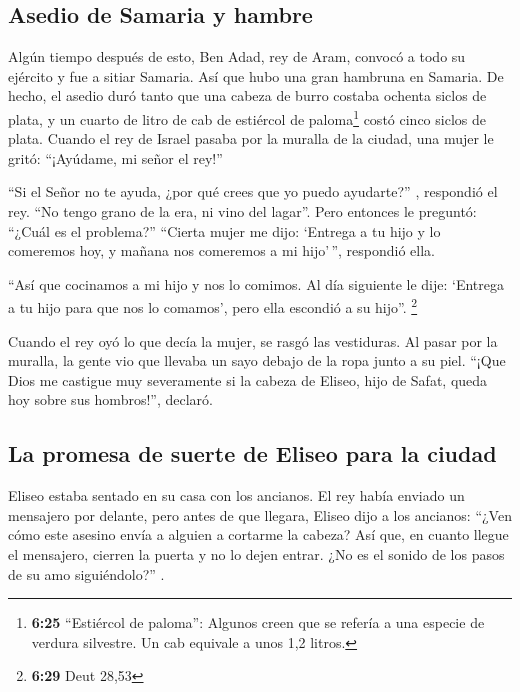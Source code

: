 \hypertarget{asedio-de-samaria-y-hambre}{%
\subsection{Asedio de Samaria y
hambre}\label{asedio-de-samaria-y-hambre}}

 Algún tiempo después de esto, Ben Adad, rey de Aram,
convocó a todo su ejército y fue a sitiar Samaria.  Así
que hubo una gran hambruna en Samaria. De hecho, el asedio duró tanto
que una cabeza de burro costaba ochenta siclos de plata, y un cuarto de
litro de cab de estiércol de paloma\footnote{\textbf{6:25} ``Estiércol
  de paloma'': Algunos creen que se refería a una especie de verdura
  silvestre. Un cab equivale a unos 1,2 litros.} costó cinco siclos de
plata.  Cuando el rey de Israel pasaba por la muralla de
la ciudad, una mujer le gritó: ``¡Ayúdame, mi señor el rey!''

 ``Si el Señor no te ayuda, ¿por qué crees que yo puedo
ayudarte?'' , respondió el rey. ``No tengo grano de la era, ni vino del
lagar''.  Pero entonces le preguntó: ``¿Cuál es el
problema?'' ``Cierta mujer me dijo: `Entrega a tu hijo y lo comeremos
hoy, y mañana nos comeremos a mi hijo'\,'', respondió ella.

 ``Así que cocinamos a mi hijo y nos lo comimos. Al día
siguiente le dije: `Entrega a tu hijo para que nos lo comamos', pero
ella escondió a su hijo''. \footnote{\textbf{6:29} Deut 28,53}

 Cuando el rey oyó lo que decía la mujer, se rasgó las
vestiduras. Al pasar por la muralla, la gente vio que llevaba un sayo
debajo de la ropa junto a su piel.  ``¡Que Dios me
castigue muy severamente si la cabeza de Eliseo, hijo de Safat, queda
hoy sobre sus hombros!'', declaró.

\hypertarget{la-promesa-de-suerte-de-eliseo-para-la-ciudad}{%
\subsection{La promesa de suerte de Eliseo para la
ciudad}\label{la-promesa-de-suerte-de-eliseo-para-la-ciudad}}

 Eliseo estaba sentado en su casa con los ancianos. El
rey había enviado un mensajero por delante, pero antes de que llegara,
Eliseo dijo a los ancianos: ``¿Ven cómo este asesino envía a alguien a
cortarme la cabeza? Así que, en cuanto llegue el mensajero, cierren la
puerta y no lo dejen entrar. ¿No es el sonido de los pasos de su amo
siguiéndolo?'' .

